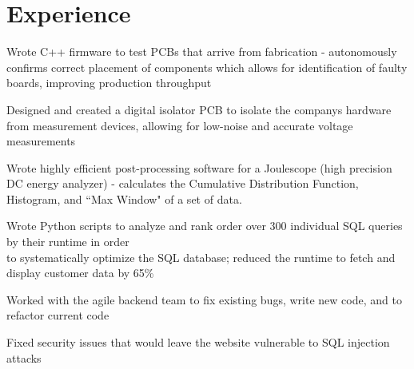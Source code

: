 \documentclass[]{deedy-resume-openfont}
\begin{document}


\section{Experience}

\begin{tightemize}
	\item Wrote C++ firmware to test PCBs that arrive from fabrication - autonomously confirms correct placement of components which allows for identification of faulty boards, improving production throughput
	\item Designed and created a digital isolator PCB to isolate the companys hardware from measurement devices, allowing for low-noise and accurate voltage measurements
	\item Wrote highly efficient post-processing software for a Joulescope (high precision DC energy analyzer) - calculates the Cumulative Distribution Function, Histogram, and ``Max Window" of a set of data.
\end{tightemize}
\vspace{8pt}

\begin{tightemize}
	\item Wrote Python scripts to analyze and rank order over 300 individual SQL queries by their runtime in order \\ to systematically optimize the SQL database; reduced the runtime to fetch and display customer data by 65\%
	\item Worked with the agile backend team to fix existing bugs, write new code, and to refactor current code
	\item Fixed security issues that would leave the website vulnerable to SQL injection attacks
\end{tightemize}
\vspace{12pt}
\end{document}
